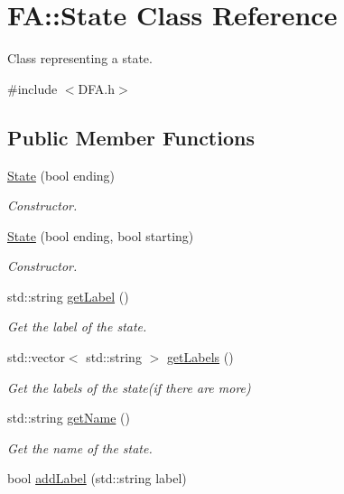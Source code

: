 \hypertarget{classFA_1_1State}{\section{F\-A\-:\-:State Class Reference}
\label{classFA_1_1State}
}


Class representing a state.  




{\ttfamily \#include $<$D\-F\-A.\-h$>$}

\subsection*{Public Member Functions}
\begin{DoxyCompactItemize}
\item 
\hyperlink{classFA_1_1State_a0cfddd8a032f4d16ff607a13bcaeede3}{State} (bool ending)
\begin{DoxyCompactList}\small\item\em Constructor. \end{DoxyCompactList}\item 
\hyperlink{classFA_1_1State_aadef24da2c4060eb6a0454fda3dff3c5}{State} (bool ending, bool starting)
\begin{DoxyCompactList}\small\item\em Constructor. \end{DoxyCompactList}\item 
std\-::string \hyperlink{classFA_1_1State_a4ee70ad75d94d7920a40b3da6ed6a30c}{get\-Label} ()
\begin{DoxyCompactList}\small\item\em Get the label of the state. \end{DoxyCompactList}\item 
std\-::vector$<$ std\-::string $>$ \hyperlink{classFA_1_1State_a2934e320330f0a4b2491a1e038c9c581}{get\-Labels} ()
\begin{DoxyCompactList}\small\item\em Get the labels of the state(if there are more) \end{DoxyCompactList}\item 
std\-::string \hyperlink{classFA_1_1State_ab1f1008c6c6c394829cb6f8718ca5415}{get\-Name} ()
\begin{DoxyCompactList}\small\item\em Get the name of the state. \end{DoxyCompactList}\item 
bool \hyperlink{classFA_1_1State_a0b7dd61ef15403f6819dfb9221d865ad}{add\-Label} (std\-::string label)

\end{DoxyCompactItemize}

